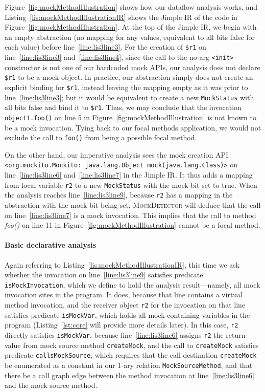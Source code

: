 Figure~\ref{fig:mockMethodIllustration} shows how our dataflow analysis works, and Listing~\ref{lis:mockMethodIllustrationIR} shows the Jimple IR of the code in Figure~\ref{fig:mockMethodIllustration}. At the top of the Jimple IR, we begin with an empty abstraction (no mapping for any values, equivalent to all bits false for each value) before line~\ref{line:lis3line3}. For the creation of \texttt{\$r1} on line~\ref{line:lis3line3} and~\ref{line:lis3line4}, since the call to the no-arg \texttt{<init>} constructor is not one of our hardcoded mock APIs, our analysis does not declare \texttt{\$r1} to be a mock object. In practice, our abstraction simply does not create an explicit binding for \texttt{\$r1}, instead leaving the mapping empty as it was prior to line~\ref{line:lis3line3}; but it would be equivalent to create a new \texttt{MockStatus} with all bits false and bind it to \texttt{\$r1}. Thus, we may conclude that the invocation \texttt{object1.foo()} on line 5 in Figure~\ref{fig:mockMethodIllustration} is not known to be a mock invocation. Tying back to our focal methods application, we would not exclude the call to \texttt{foo()} from being a possible focal method.

On the other hand, our imperative analysis sees the mock creation API \texttt{<org.mockito.Mockito: java.lang.Object mock(java.lang.Class)>} on line~\ref{line:lis3line6} and~\ref{line:lis3line7} in the Jimple IR. It thus adds a mapping from local variable \texttt{r2} to a new \texttt{MockStatus} with the mock bit set to true. When the analysis reaches line~\ref{line:lis3line9}, because \texttt{r2} has a mapping in the abstraction with the mock bit being set, \textsc{MockDetector} will deduce that the call on line~\ref{line:lis3line7} is a mock invocation. This implies that the call to method \textit{foo()} on line 11 in Figure~\ref{fig:mockMethodIllustration} cannot be a focal method.

\paragraph{Basic declarative analysis} Again referring to Listing~\ref{lis:mockMethodIllustrationIR}, this time we ask whether the invocation on line~\ref{line:lis3line9} satisfies predicate \texttt{isMockInvocation}, which we define to hold the analysis result---namely, all mock invocation sites in the program. It does, because that line contains a virtual method invocation, and the receiver object \texttt{r2} for the invocation on that line satisfies predicate \texttt{isMockVar}, which holds all mock-containing variables in the program (Listing~\ref{lst:core} will provide more details later). In this case, \texttt{r2} directly satisfies \texttt{isMockVar}, because line~\ref{line:lis3line6} assigns \texttt{r2} the return value from mock source method \texttt{createMock}, and the call to \texttt{createMock} satisfies predicate \texttt{callsMockSource}, which requires that the call destination \texttt{createMock} be enumerated as a constant in our 1-ary relation \texttt{MockSourceMethod}, and that there be a call graph edge between the method invocation at line~\ref{line:lis3line6} and the mock source method.

